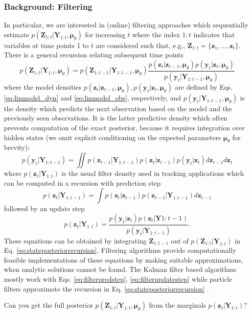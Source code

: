 \documentclass[a4paper,10pt]{article}
\newcommand{\bs}[1]{\mathbf{#1}}					%
\newcommand{\bgs}[1]{\boldsymbol{#1}}				%
\newcommand{\eq}[1]{\begin{equation} #1 \end{equation}}%
\renewcommand{\ss}{z}         %
\newcommand{\so}{y}         %
\newcommand{\spm}{\mu}    %
\renewcommand{\sp}{\theta}    %
\newcommand{\ps}{\bs{\ss}}    %
\newcommand{\po}{\bs{\so}}    %
\newcommand{\ppm}{\bgs{\spm}}   %
\newcommand{\Ps}{\bs{Z}}    %
\newcommand{\Po}{\bs{Y}}    %
\begin{document}
\subsubsection{Background: Filtering}
In particular, we are interested in (online) filtering approaches which sequentially estimate $p(\Ps_{1:t}|\Po_{1:t},\ppm_\sp)$ for increasing $t$ where the index $1:t$ indicates that variables at time points 1 to $t$ are considered such that, e.g., $\Ps_{1:t} = \{\ps_1, \dots, \ps_t\}$. There is a general recursion relating subsequent time points \cite[see e.g.][]{Doucet2011}
\eq{
    \label{eq:stateposteriorrecursion} p(\Ps_{1:t}|\Po_{1:t},\ppm_\sp) = p(\Ps_{1:t-1}|\Po_{1:t-1},\ppm_\sp)\frac{p(\ps_t|\ps_{t-1},\ppm_\sp)p(\po_t|\ps_t,\ppm_\sp)}{p(\po_t|\Po_{1:t-1},\ppm_\sp)}
}
where the model densities $p(\ps_t|\ps_{t-1},\ppm_\sp), p(\po_t|\ps_t,\ppm_\sp)$ are defined by Eqs. \ref{eq:linmodel_dyn} and \ref{eq:linmodel_obs}, respectively, and $p(\po_t|\Po_{1:t-1},\ppm_\sp)$ is the density which predicts the next observation based on the model and the previously seen observations. It is the latter predictive density which often prevents computation of the exact posterior, because it requires integration over hidden states (we omit explicit conditioning on the expected parameters $\ppm_\sp$ for brevity):
\eq{
    p(\po_t|\Po_{1:t-1}) = \iint p(\ps_{t-1}|\Po_{1:t-1}) p(\ps_t|\ps_{t-1}) p(\po_t|\ps_t) d\ps_{t-1} d\ps_t
}
where $p(\ps_t|\Po_{1:t})$ is the usual filter density used in tracking applications which can be computed in a recursion with prediction step
\eq{
    \label{eq:filterpredstep} p(\ps_t|\Po_{1:t-1}) = \int p(\ps_t|\ps_{t-1}) p(\ps_{t-1}|\Po_{1:t-1}) d\ps_{t-1}
}
followed by an update step
\eq{
    \label{eq:filterupdatestep} p(\ps_t|\Po_{1:t}) = \frac{p(\po_t|\ps_t) p(\ps_t|\Po{1:t-1})}{p(\po_t|\Po_{1:t-1})}.
}
These equations can be obtained by integrating $\Ps_{1:t-1}$ out of $p(\Ps_{1:t}|\Po_{1:t})$ in Eq. \ref{eq:stateposteriorrecursion}. Filtering algorithms provide computationally feasible implementations of these equations by making suitable approximations, when analytic solutions cannot be found. The Kalman filter based algorithms mostly work with Eqs. \ref{eq:filterpredstep}, \ref{eq:filterupdatestep} while particle filters approximate the recursion in Eq. \ref{eq:stateposteriorrecursion} \cite{Doucet2011}.

Can you get the full posterior $p(\Ps_{1:t}|\Po_{1:t},\ppm_\sp)$ from the marginals $p(\ps_t|\Po_{1:t})$?
\end{document}
